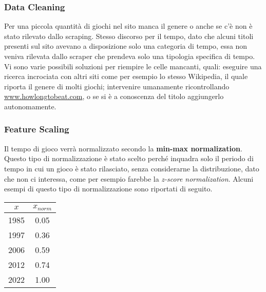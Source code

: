         \subsubsection{Data Cleaning}
            Per una piccola quantità di giochi nel sito manca il genere o anche se c'è non è stato rilevato dallo scraping. Stesso discorso per il tempo, dato che alcuni titoli presenti sul sito avevano a disposizione solo una categoria di tempo, essa non veniva rilevata dallo scraper che prendeva solo una tipologia specifica di tempo. Vi sono varie possibili soluzioni per riempire le celle mancanti, quali: eseguire una ricerca incrociata con altri siti come per esempio lo stesso Wikipedia, il quale riporta il genere di molti giochi; intervenire umanamente ricontrollando \url{www.howlongtobeat.com}, o se si è a conoscenza del titolo aggiungerlo autonomamente.
            
        \subsubsection{Feature Scaling}
            Il tempo di gioco verrà normalizzato secondo la \textbf{min-max normalization}. Questo tipo di normalizzazione è stato scelto perché inquadra solo il periodo di tempo in cui un gioco è stato rilasciato, senza considerarne la distribuzione, dato che non ci interessa, come per esempio farebbe la \textit{z-score normalization}. Alcuni esempi di questo tipo di normalizzazione sono riportati di seguito.
            \begin{center}
                \begin{tabular}{|c|c|}
                \hline
                $x$  & $x_{norm}$ \\ \hline
                1985 & 0.05     \\ \hline
                1997 & 0.36     \\ \hline
                2006 & 0.59     \\ \hline
                2012 & 0.74     \\ \hline
                2022 & 1.00     \\ \hline
                \end{tabular}
            \end{center}
        
